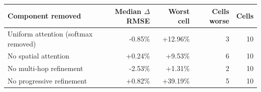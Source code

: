 \begin{tabular}{lrrrr}
\hline
Component removed & Median $\Delta$RMSE & Worst cell & Cells worse & Cells \\
\hline
Uniform attention (softmax removed) & -0.85\% & +12.96\% & 3 & 10 \\
No spatial attention & +0.24\% & +9.53\% & 6 & 10 \\
No multi-hop refinement & -2.53\% & +1.31\% & 2 & 10 \\
No progressive refinement & +0.82\% & +39.19\% & 5 & 10 \\
\hline
\end{tabular}
